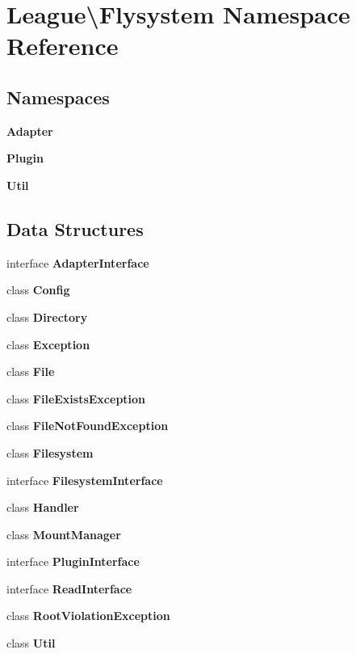 \section{League\textbackslash{}Flysystem Namespace Reference}
\label{namespace_league_1_1_flysystem}
\subsection*{Namespaces}
\begin{DoxyCompactItemize}
\item 
 {\bf Adapter}
\item 
 {\bf Plugin}
\item 
 {\bf Util}
\end{DoxyCompactItemize}
\subsection*{Data Structures}
\begin{DoxyCompactItemize}
\item 
interface {\bf Adapter\+Interface}
\item 
class {\bf Config}
\item 
class {\bf Directory}
\item 
class {\bf Exception}
\item 
class {\bf File}
\item 
class {\bf File\+Exists\+Exception}
\item 
class {\bf File\+Not\+Found\+Exception}
\item 
class {\bf Filesystem}
\item 
interface {\bf Filesystem\+Interface}
\item 
class {\bf Handler}
\item 
class {\bf Mount\+Manager}
\item 
interface {\bf Plugin\+Interface}
\item 
interface {\bf Read\+Interface}
\item 
class {\bf Root\+Violation\+Exception}
\item 
class {\bf Util}
\end{DoxyCompactItemize}
